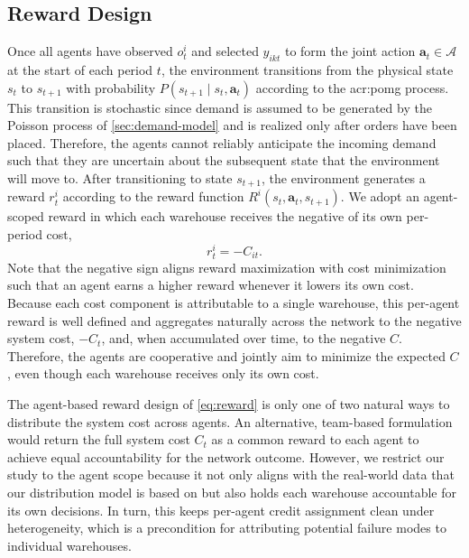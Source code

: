 \subsection{Reward Design}
\label{subsec:reward-design}
Once all agents have observed $o^i_{t}$ and selected $y_{ikt}$ to form the joint action $\mathbf{a}_t \in \mathcal{A}$ at the start of each period $t$, the environment transitions from the physical state $s_t$ to $s_{t+1}$ with probability $P(s_{t+1} \mid s_t, \mathbf{a}_t)$ according to the \gls{acr:pomg} process. This transition is stochastic since demand is assumed to be generated by the Poisson process of \autoref{sec:demand-model} and is realized only after orders have been placed. Therefore, the agents cannot reliably anticipate the incoming demand such that they are uncertain about the subsequent state that the environment will move to. 
After transitioning to state $s_{t+1}$, the environment generates a reward $r_t^i$ according to the reward function $R^i(s_t,\mathbf{a}_t,s_{t+1})$. We adopt an agent-scoped reward in which each warehouse receives the negative of its own per-period cost,
\begin{equation}
\label{eq:reward}
  r^i_t  = -C_{it}.
\end{equation}
Note that the negative sign aligns reward maximization with cost minimization such that an agent earns a higher reward whenever it lowers its own cost. Because each cost component is attributable to a single warehouse, this per-agent reward is well defined and aggregates naturally across the network to the negative system cost, $-C_t$, and, when accumulated over time, to the negative $C$. Therefore, the agents are cooperative and jointly aim to minimize the expected $C$, even though each warehouse receives only its own cost. 

The agent-based reward design of \autoref{eq:reward} is only one of two natural ways to distribute the system cost across agents. An alternative, team-based formulation would return the full system cost $C_t$ as a common reward to each agent to achieve equal accountability for the network outcome. However, we restrict our study to the agent scope because it not only aligns with the real-world data that our distribution model is based on but also holds each warehouse accountable for its own decisions. In turn, this keeps per-agent credit assignment clean under heterogeneity, which is a precondition for attributing potential failure modes to individual warehouses.\\


